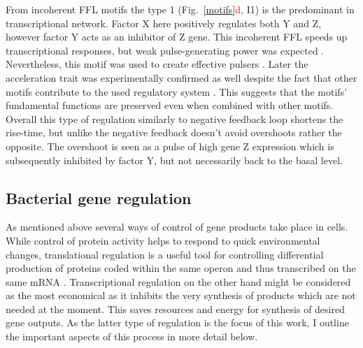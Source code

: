 From incoherent FFL motifs the type 1 (Fig.~\ref{motifs}\textcolor{red}{d}, I1) is the predominant in  transcriptional network.
Factor X here positively regulates both Y and Z, however factor Y acts as an inhibitor of Z gene.
This incoherent FFL speeds up transcriptional responses, but weak pulse-generating power was expected \cite{mangan2003structure}.
Nevertheless, this motif was used to create effective pulsers \cite{basu2004spatiotemporal}.
Later the acceleration trait was experimentally confirmed as well despite the fact that other motifs contribute to the used regulatory system \cite{mangan2006incoherent}.
This suggests that the motifs' fundamental functions are preserved even when combined with other motifs.
Overall this type of regulation similarly to negative feedback loop shortens the rise-time, but unlike the negative feedback doesn't avoid overshoots rather the opposite.
The overshoot is seen as a pulse of high gene Z expression which is subsequently inhibited by factor Y, but not necessarily back to the basal level.


\subsection{Bacterial gene regulation}
As mentioned above several ways of control of gene products take place in cells.
While control of protein activity helps to respond to quick environmental changes, translational regulation is a useful tool for controlling differential production of proteins coded within the same operon and thus transcribed on the same mRNA \cite{dar2018extensive}.
Transcriptional regulation on the other hand might be considered as the most economical as it inhibits the very synthesis of products which are not needed at the moment.
This saves resources and energy for synthesis of desired gene outputs.
As the latter type of regulation is the focus of this work, I outline the important aspects of this process in more detail below.

